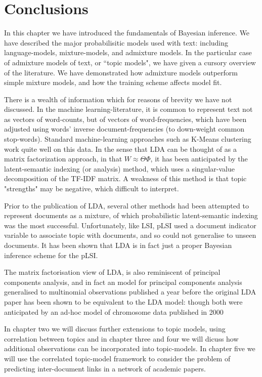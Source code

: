 \section{Conclusions}
In this chapter we have introduced the fundamentals of Bayesian inference. We have described the major probabilisitic models used with text: including language-models, mixture-models, and admixture models. In the particular case of admixture models of text, or ``topic models", we have given a cursory overview of the literature. We have demonstrated how admixture models outperform simple mixture models, and how the training scheme affects model fit. 


There is a wealth of information which for reasons of brevity we have not discussed. In the machine learning-literature, it is common to represent text not as vectors of word-counts, but of vectors of word-frequencies, which have been adjusted using words' inverse document-frequencies (to down-weight common stop-words). Standard machine-learning approaches such as K-Means clustering work quite well on this data. In the sense that LDA can be thought of as a matrix factorization approach, in that $W \approx \Theta \Phi$, it has been anticipated by the latent-semantic indexing (or analysis) method, which uses a singular-value decomposition of the TF-IDF matrix. A weakness of this method is that topic "strengths" may be negative, which difficult to interpret. 

Prior to the publication of LDA, several other methods had been attempted to represent documents as a mixture, of which probabilistic latent-semantic indexing \cite{Hofmann1999a} was the most successful. Unfortunately, like LSI, pLSI used a document indicator variable to associate topic with documents, and so could not generalise to unseen documents. It has been shown\cite{GiKa2003} that LDA is in fact just a proper Bayesian inference scheme for the pLSI. 

The matrix factorisation view of LDA, is also reminiscent of principal components analysis, and in fact an model for principal components analysis generalised to multinomial observations\cite{Buntine2002} published a year before the original LDA paper has been shown to be equivalent to the LDA model: though both were anticipated by an ad-hoc model of chromosome data published in 2000\cite{Pritchard2000}

In chapter two we will discuss further extensions to topic models, using correlation between topics and in chapter three and four we will dicuss how additional observations can be incorporated into topic-models. In chapter five we will use the correlated topic-model framework to consider the problem of predicting inter-document links in a network of academic papers.


